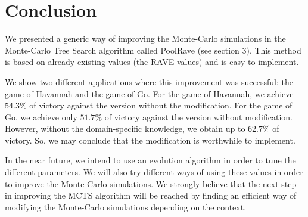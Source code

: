 \documentclass{llncs}
\begin{document}
\section{Conclusion}

We presented a generic way of improving the Monte-Carlo simulations in the Monte-Carlo Tree Search algorithm called PoolRave (see section 3). This method is based on already existing values (the RAVE values) and is easy to implement.

We show two different applications where this improvement was successful: the game of Havannah and the game of Go. 
For the game of Havannah, we achieve $54.3\%$ of victory against the version without the modification.
For the game of Go, we achieve only $51.7\%$ of victory against the version without modification. However, without the domain-specific knowledge, we obtain up to $62.7\%$ of victory. So, we may conclude that the modification is worthwhile to implement.

In the near future, we intend to use an evolution algorithm in order to tune the different parameters. We will also try different ways of using these values in order to improve the Monte-Carlo simulations. We strongly believe that the next step in improving the MCTS algorithm will be reached by finding an efficient way of modifying the Monte-Carlo simulations depending on the context.





\end{document}
